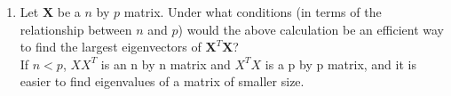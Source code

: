 \begin{enumerate}
\item Let $\mathbf{X}$ be a $n$ by $p$ matrix. Under what conditions (in terms of the relationship between $n$ and $p$) would the above calculation be an efficient way to find the largest eigenvectors of $\mathbf{X}^T\mathbf{X}$?
~\\

If $n<p$, $XX^T$ is an n by n matrix and $X^T X$ is a p by p matrix, and it is easier to find eigenvalues of a matrix of smaller size.

\end{enumerate}
